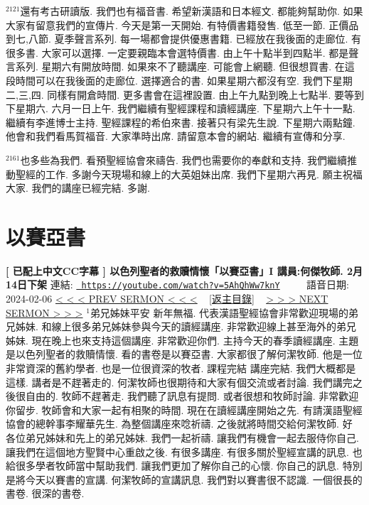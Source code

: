 \documentclass{book}
\begin{document}
$^{2121}$還有考古研讀版.
我們也有福音書.
希望新漢語和日本經文.
都能夠幫助你.
如果大家有留意我們的宣傳片.
今天是第一天開始.
有特價書籍發售.
低至一節.
正價品到七,八節.
夏季聲言系列.
每一場都會提供優惠書籍.
已經放在我後面的走廊位.
有很多書.
大家可以選擇.
一定要親臨本會選特價書.
由上午十點半到四點半.
都是聲言系列.
星期六有開放時間.
如果來不了聽講座.
可能會上網聽.
但很想買書.
在這段時間可以在我後面的走廊位.
選擇適合的書.
如果星期六都沒有空.
我們下星期二,三,四.
同樣有開倉時間.
更多書會在這裡設置.
由上午九點到晚上七點半.
要等到下星期六.
六月一日上午.
我們繼續有聖經課程和讀經講座.
下星期六上午十一點.
繼續有李進博士主持.
聖經課程的希伯來書.
接著只有梁先生說.
下星期六兩點鐘.
他會和我們看馬賀福音.
大家準時出席.
請留意本會的網站.
繼續有宣傳和分享.

$^{2161}$也多些為我們.
看預聖經協會來禱告.
我們也需要你的奉獻和支持.
我們繼續推動聖經的工作.
多謝今天現場和線上的大英姐妹出席.
我們下星期六再見.
願主祝福大家.
我們的講座已經完結.
多謝.
\newpage



\section{以賽亞書}
\label{sec:5AhQhWw7knY}
\textbf{[ 已配上中文CC字幕 ] 以色列聖者的救贖情懷「以賽亞書」I 講員:何傑牧師. 2月14日下架}
\newline
\newline
連結: \href{https://youtube.com/watch?v=5AhQhWw7knY}{\texttt{ https://youtube.com/watch?v=5AhQhWw7knY}} ~~~~ 語音日期: 2024-02-06 
\newline
\newline
\hyperref[sec:BQvEiworls4]{\small{< < < PREV SERMON < < <}}
~
\hyperref[sec:index]{\small{[返主目錄]}}
~
\hyperref[sec:KwXlOVraPWE]{\small{> > > NEXT SERMON > > >}}
\newline
\newline
$^{1}$弟兄姊妹平安 新年無福.
代表漢語聖經協會非常歡迎現場的弟兄姊妹.
和線上很多弟兄姊妹參與今天的讀經講座.
非常歡迎線上甚至海外的弟兄姊妹.
現在晚上也來支持這個講座.
非常歡迎你們.
主持今天的春季讀經講座.
主題是以色列聖者的救贖情懷.
看的書卷是以賽亞書.
大家都很了解何潔牧師.
他是一位非常資深的舊約學者.
也是一位很資深的牧者.
課程完結 講座完結.
我們大概都是這樣.
講者是不趕著走的.
何潔牧師也很期待和大家有個交流或者討論.
我們講完之後很自由的.
牧師不趕著走.
我們聽了訊息有提問.
或者很想和牧師討論.
非常歡迎你留步.
牧師會和大家一起有相聚的時間.
現在在讀經講座開始之先.
有請漢語聖經協會的總幹事李耀華先生.
為整個講座來唸祈禱.
之後就將時間交給何潔牧師.
好 各位弟兄姊妹和先上的弟兄姊妹.
我們一起祈禱.
讓我們有機會一起去服侍你自己.
讓我們在這個地方聖賢中心重啟之後.
有很多講座.
有很多關於聖經宣講的訊息.
也給很多學者牧師當中幫助我們.
讓我們更加了解你自己的心懷.
你自己的訊息.
特別是將今天以賽書的宣講.
何潔牧師的宣講訊息.
我們對以賽書很不認識.
一個很長的書卷.
很深的書卷.
\end{document}
